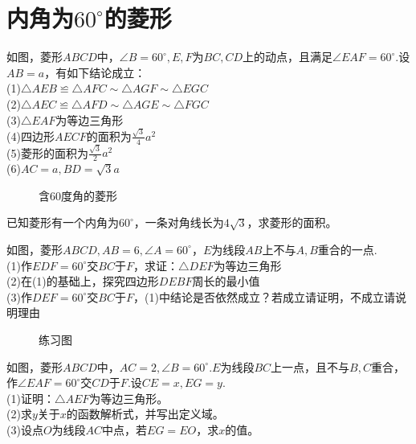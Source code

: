 \section{内角为$60^\circ$的菱形}
\begin{definition}
    如图，菱形$ABCD$中，$\angle B=60^\circ,E,F$为$BC,CD$上的动点，且满足$\angle EAF=60^\circ$.设$AB=a$，有如下结论成立：\\
    (1)$\triangle AEB \backcong \triangle AFC \sim \triangle AGF \sim \triangle EGC$ \\
    (2)$\triangle AEC \backcong \triangle AFD \sim \triangle AGE \sim \triangle FGC$ \\
    (3)$\triangle EAF$为等边三角形 \\
    (4)四边形$AECF$的面积为$\frac{\sqrt3}{4}a^2$ \\
    (5)菱形的面积为$\frac{\sqrt3}{2}a^2$ \\
    (6)$AC=a,BD=\sqrt3a$
\end{definition}
\begin{figure}[H]
    \centering
    \resizebox{4cm}{!}{}
    \caption{含60度角的菱形}
\end{figure}
\begin{problem}
已知菱形有一个内角为$60^\circ$，一条对角线长为$4\sqrt3$，求菱形的面积。
\end{problem}
\begin{problem}
如图，菱形$ABCD,AB=6,\angle A=60^\circ$，$E$为线段$AB$上不与$A,B$重合的一点. \\
(1)作$EDF=60^\circ$交$BC$于$F$，求证：$\triangle DEF$为等边三角形\\
(2)在(1)的基础上，探究四边形$DEBF$周长的最小值 \\
(3)作$DEF=60^\circ$交$BC$于$F$，(1)中结论是否依然成立？若成立请证明，不成立请说明理由 \\
\end{problem}
\begin{figure}[H]
    \centering
    \resizebox{4cm}{!}{}
    \caption{练习图}
\end{figure}
\begin{problem}
如图，菱形$ABCD$中，$AC=2,\angle B=60^\circ$.$E$为线段$BC$上一点，且不与$B,C$重合，作$\angle EAF=60^\circ$交$CD$于$F$.设$CE=x,EG=y$.\\
(1)证明：$\triangle AEF$为等边三角形。 \\
(2)求$y$关于$x$的函数解析式，并写出定义域。 \\
(3)设点$O$为线段$AC$中点，若$EG=EO$，求$x$的值。 \\
\end{problem}
